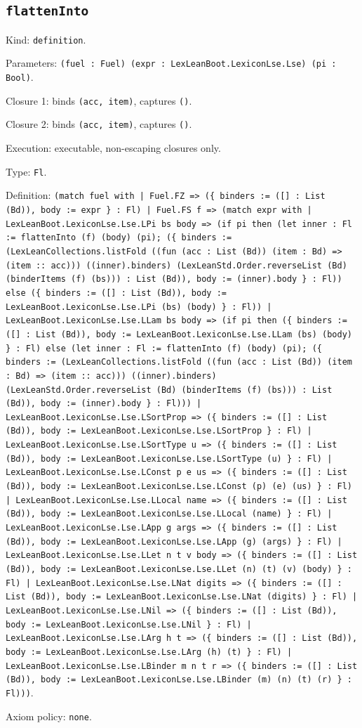 \documentclass[11pt]{article}
\begin{document}
\subsection*{\texttt{flattenInto}}
\noindent Kind: \texttt{definition}.\par
\noindent Parameters: \texttt{(fuel : Fuel) (expr : LexLeanBoot.LexiconLse.Lse) (pi : Bool)}.\par
\noindent Closure 1: binds \texttt{(acc, item)}, captures \texttt{()}.\par
\noindent Closure 2: binds \texttt{(acc, item)}, captures \texttt{()}.\par
\noindent Execution: executable, non-escaping closures only.\par
\noindent Type: \texttt{Fl}.\par
\noindent Definition: \texttt{(match fuel with | Fuel.FZ => (\{ binders := ([] : List (Bd)), body := expr \} : Fl) | Fuel.FS f => (match expr with | LexLeanBoot.LexiconLse.Lse.LPi bs body => (if pi then (let inner : Fl := flattenInto (f) (body) (pi); (\{ binders := (LexLeanCollections.listFold ((fun (acc : List (Bd)) (item : Bd) => (item :: acc))) ((inner).binders) (LexLeanStd.Order.reverseList (Bd) (binderItems (f) (bs))) : List (Bd)), body := (inner).body \} : Fl)) else (\{ binders := ([] : List (Bd)), body := LexLeanBoot.LexiconLse.Lse.LPi (bs) (body) \} : Fl)) | LexLeanBoot.LexiconLse.Lse.LLam bs body => (if pi then (\{ binders := ([] : List (Bd)), body := LexLeanBoot.LexiconLse.Lse.LLam (bs) (body) \} : Fl) else (let inner : Fl := flattenInto (f) (body) (pi); (\{ binders := (LexLeanCollections.listFold ((fun (acc : List (Bd)) (item : Bd) => (item :: acc))) ((inner).binders) (LexLeanStd.Order.reverseList (Bd) (binderItems (f) (bs))) : List (Bd)), body := (inner).body \} : Fl))) | LexLeanBoot.LexiconLse.Lse.LSortProp => (\{ binders := ([] : List (Bd)), body := LexLeanBoot.LexiconLse.Lse.LSortProp \} : Fl) | LexLeanBoot.LexiconLse.Lse.LSortType u => (\{ binders := ([] : List (Bd)), body := LexLeanBoot.LexiconLse.Lse.LSortType (u) \} : Fl) | LexLeanBoot.LexiconLse.Lse.LConst p e us => (\{ binders := ([] : List (Bd)), body := LexLeanBoot.LexiconLse.Lse.LConst (p) (e) (us) \} : Fl) | LexLeanBoot.LexiconLse.Lse.LLocal name => (\{ binders := ([] : List (Bd)), body := LexLeanBoot.LexiconLse.Lse.LLocal (name) \} : Fl) | LexLeanBoot.LexiconLse.Lse.LApp g args => (\{ binders := ([] : List (Bd)), body := LexLeanBoot.LexiconLse.Lse.LApp (g) (args) \} : Fl) | LexLeanBoot.LexiconLse.Lse.LLet n t v body => (\{ binders := ([] : List (Bd)), body := LexLeanBoot.LexiconLse.Lse.LLet (n) (t) (v) (body) \} : Fl) | LexLeanBoot.LexiconLse.Lse.LNat digits => (\{ binders := ([] : List (Bd)), body := LexLeanBoot.LexiconLse.Lse.LNat (digits) \} : Fl) | LexLeanBoot.LexiconLse.Lse.LNil => (\{ binders := ([] : List (Bd)), body := LexLeanBoot.LexiconLse.Lse.LNil \} : Fl) | LexLeanBoot.LexiconLse.Lse.LArg h t => (\{ binders := ([] : List (Bd)), body := LexLeanBoot.LexiconLse.Lse.LArg (h) (t) \} : Fl) | LexLeanBoot.LexiconLse.Lse.LBinder m n t r => (\{ binders := ([] : List (Bd)), body := LexLeanBoot.LexiconLse.Lse.LBinder (m) (n) (t) (r) \} : Fl)))}.\par
\noindent Axiom policy: \texttt{none}.\par
\end{document}
